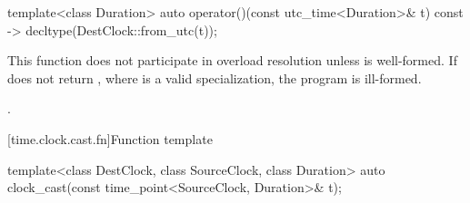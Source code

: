 %
\begin{itemdecl}
template<class Duration>
  auto operator()(const utc_time<Duration>& t) const
    -> decltype(DestClock::from_utc(t));
\end{itemdecl}

\begin{itemdescr}
\pnum
\remarks
This function does not participate in overload resolution unless
 is well-formed.
If  does not return
,
where  is a valid  specialization,
the program is ill-formed.

\pnum
\returns
{}.
\end{itemdescr}

[time.clock.cast.fn]{Function template }

%
\begin{itemdecl}
template<class DestClock, class SourceClock, class Duration>
  auto clock_cast(const time_point<SourceClock, Duration>& t);
\end{itemdecl}

